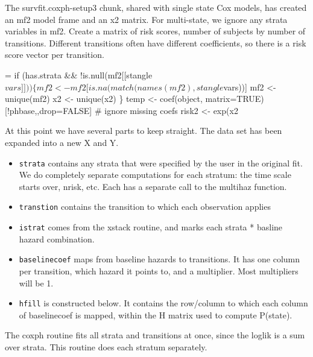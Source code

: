 \documentclass{article}
\newcommand{\code}[1]{\texttt{#1}}
\begin{document}

The survfit.coxph-setup3 chunk, shared with single state Cox models, has created
an mf2 model frame and an x2 matrix. 
For multi-state, we ignore any strata variables in mf2.
Create a matrix of risk scores, number of subjects by number of transitions.
Different transitions often have different coefficients, so there is a risk
score vector per transition.

\begin{nwchunk}
=
 if (has.strata && !is.null(mf2[[stangle$vars]]))\{
     mf2 <- mf2[is.na(match(names(mf2), stangle$vars))]
     mf2 <- unique(mf2)
     x2 <- unique(x2)
 \}
 temp <- coef(object, matrix=TRUE)[!phbase,,drop=FALSE] # ignore missing coefs
 risk2 <- exp(x2 %
\end{nwchunk}

At this point we have several parts to keep straight.  The data set has been
expanded into a new X and Y.
\begin{itemize}
  \item \code{strata} contains any strata that were specified by the user
    in the original fit. We do completely separate computations for each
    stratum: the time scale starts over, nrisk, etc.  Each has a separate
    call to the multihaz function.
  \item \code{transtion} contains the transition to which each observation
    applies
  \item \code{istrat} comes from the xstack routine, and marks each
    strata * basline hazard combination.
  \item \code{baselinecoef} maps from baseline hazards to transitions.  It
    has one column per transition, which hazard it points to, and a
    multiplier. Most multipliers will be 1.
  \item \code{hfill} is constructed below. It contains the row/column to which
    each column of baselinecoef is mapped, within the H matrix used to compute
    P(state).
\end{itemize}
The coxph routine fits all strata and transitions at once, since the loglik is
a sum over strata.  This routine does each stratum separately.
\end{document}
